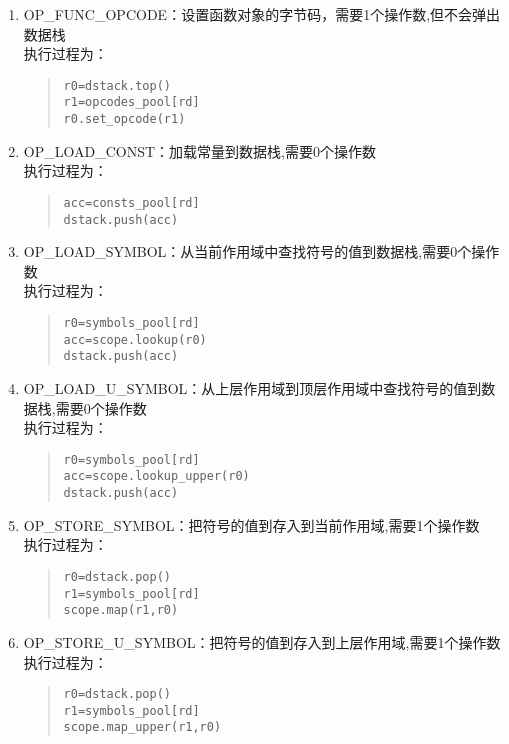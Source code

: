 \begin{enumerate}
\item OP\_FUNC\_OPCODE：设置函数对象的字节码，需要1个操作数,但不会弹出数据栈 \\
执行过程为：
\begin{quote}
\begin{verbatim}
r0=dstack.top()
r1=opcodes_pool[rd]
r0.set_opcode(r1)
\end{verbatim}
\end{quote}

\item OP\_LOAD\_CONST：加载常量到数据栈,需要0个操作数 \\
执行过程为：
\begin{quote}
\begin{verbatim}
acc=consts_pool[rd]
dstack.push(acc)
\end{verbatim}
\end{quote}

\item OP\_LOAD\_SYMBOL：从当前作用域中查找符号的值到数据栈,需要0个操作数 \\
执行过程为：
\begin{quote}
\begin{verbatim}
r0=symbols_pool[rd]
acc=scope.lookup(r0)
dstack.push(acc)
\end{verbatim}
\end{quote}

\item OP\_LOAD\_U\_SYMBOL：从上层作用域到顶层作用域中查找符号的值到数据栈,需要0个操作数 \\
执行过程为：
\begin{quote}
\begin{verbatim}
r0=symbols_pool[rd]
acc=scope.lookup_upper(r0)
dstack.push(acc)
\end{verbatim}
\end{quote}

\item OP\_STORE\_SYMBOL：把符号的值到存入到当前作用域,需要1个操作数 \\
执行过程为：
\begin{quote}
\begin{verbatim}
r0=dstack.pop()
r1=symbols_pool[rd]
scope.map(r1,r0)
\end{verbatim}
\end{quote}

\item OP\_STORE\_U\_SYMBOL：把符号的值到存入到上层作用域,需要1个操作数 \\
执行过程为：
\begin{quote}
\begin{verbatim}
r0=dstack.pop()
r1=symbols_pool[rd]
scope.map_upper(r1,r0)
\end{verbatim}
\end{quote}


\end{enumerate}
